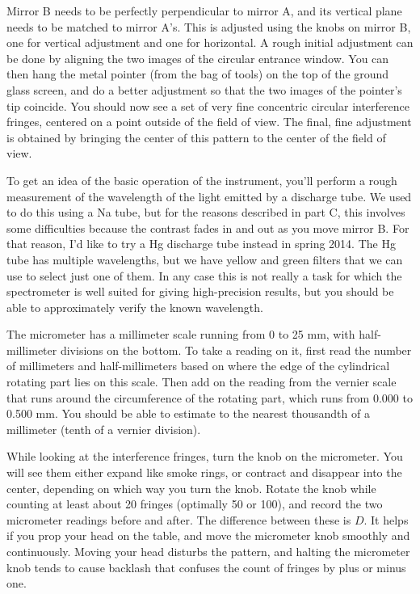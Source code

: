 Mirror B needs to be perfectly perpendicular to mirror A, and its vertical plane
needs to be matched to mirror A's. This is adjusted using the knobs on mirror B,
one for vertical adjustment and one for horizontal. A rough initial adjustment
can be done by aligning the two images of the circular entrance window. You can
then hang the metal pointer (from the bag of tools) on the top of the ground glass
screen, and do a better adjustment so that the two images of the pointer's
tip coincide. You should now see a set of very fine concentric circular interference
fringes, centered on a point outside of the field of view. The final, fine
adjustment is obtained by bringing the center of this pattern to the center of the
field of view.


To get an idea of the basic operation of the instrument, you'll perform a rough
measurement of the wavelength of the light emitted by a discharge tube.
We used to do this using a Na tube, but for the reasons described in part C,
this involves some difficulties because the contrast fades in and out as you
move mirror B. For that reason, I'd like to try a Hg discharge tube instead
in spring 2014. The Hg tube has multiple wavelengths, but we have yellow and
green filters that we can use to select just one of them.
In any case this is not really a task for which the spectrometer is well suited for giving high-precision
results, but you should be able to approximately verify the known wavelength.

The micrometer has a millimeter scale running from 0 to 25 mm, with half-millimeter
divisions on the bottom. To take a reading on it, first read the number of
millimeters and half-millimeters based on where the edge of the cylindrical
rotating part lies on this scale. Then add on the reading from the vernier
scale that runs around the circumference of the rotating part, which runs from
0.000 to 0.500 mm. You should be able to estimate to the nearest thousandth of
a millimeter (tenth of a vernier division).

While looking at the interference fringes, turn the knob on the micrometer.
You will see them either expand like smoke rings, or contract and disappear
into the center, depending on which way you turn the knob. Rotate the knob
while counting at least about 20 fringes (optimally 50 or 100), and record the two micrometer readings before and
after. The difference between these is $D$. It helps if you prop your head on the table, and move the micrometer knob
smoothly and continuously. Moving your head disturbs the pattern, and halting the
micrometer knob tends to cause backlash that confuses the count of fringes by
plus or minus one.

